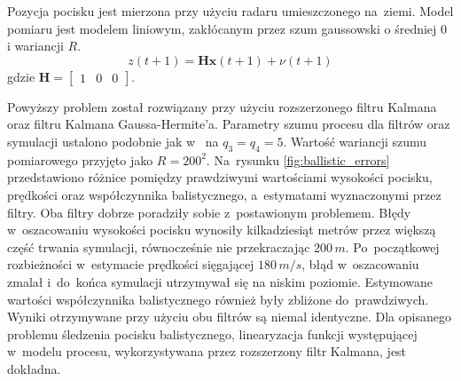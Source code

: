 Pozycja pocisku jest mierzona przy użyciu radaru umieszczonego na~ziemi. Model pomiaru jest modelem liniowym, zakłócanym przez szum gaussowski o średniej $0$ i wariancji $R$.
\begin{equation}
z(t+1) = \boldsymbol{H}\boldsymbol{x}(t+1) + \nu(t+1)
\end{equation}
gdzie $\boldsymbol{H} = \begin{bmatrix}
1 & 0 & 0
\end{bmatrix}$. \par
Powyższy problem został rozwiązany przy użyciu rozszerzonego filtru Kalmana oraz filtru Kalmana Gaussa-Hermite'a. Parametry szumu procesu dla filtrów oraz symulacji ustalono podobnie jak w~\cite{MisslieTracking1} na $q_3=q_4=5$. Wartość wariancji szumu pomiarowego przyjęto jako $R=200^2$. Na~rysunku \ref{fig:ballistic_errors} przedstawiono różnice pomiędzy prawdziwymi wartościami wysokości pocisku, prędkości oraz współczynnika balistycznego, a~estymatami wyznaczonymi przez filtry. Oba filtry dobrze poradziły sobie z~postawionym problemem. Błędy w~oszacowaniu wysokości pocisku wynosiły kilkadziesiąt metrów przez większą część trwania symulacji, równocześnie nie przekraczając $200\,m$. Po~początkowej rozbieżności w~estymacie prędkości sięgającej $180\, m/s$, błąd w~oszacowaniu zmalał i~do~końca symulacji utrzymywał się na niskim poziomie. Estymowane wartości współczynnika balistycznego również były zbliżone do~prawdziwych. Wyniki otrzymywane przy użyciu obu filtrów są niemal identyczne. Dla opisanego problemu śledzenia pocisku balistycznego, linearyzacja funkcji występującej w~modelu procesu, wykorzystywana przez rozszerzony filtr Kalmana, jest dokładna.

